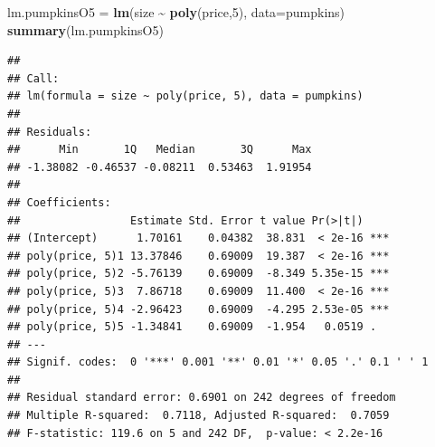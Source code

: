 \documentclass[
]{book}
\newenvironment{Shaded}{\begin{snugshade}}{\end{snugshade}}
\newcommand{\AttributeTok}[1]{\textcolor[rgb]{0.13,0.29,0.53}{#1}}
\newcommand{\DecValTok}[1]{\textcolor[rgb]{0.00,0.00,0.81}{#1}}
\newcommand{\FunctionTok}[1]{\textcolor[rgb]{0.13,0.29,0.53}{\textbf{#1}}}
\newcommand{\NormalTok}[1]{#1}
\newcommand{\OtherTok}[1]{\textcolor[rgb]{0.56,0.35,0.01}{#1}}
\newcommand{\SpecialCharTok}[1]{\textcolor[rgb]{0.81,0.36,0.00}{\textbf{#1}}}
\begin{document}
\begin{Shaded}
\begin{Highlighting}[]
\NormalTok{lm.pumpkinsO5 }\OtherTok{=}  \FunctionTok{lm}\NormalTok{(size }\SpecialCharTok{\textasciitilde{}} \FunctionTok{poly}\NormalTok{(price,}\DecValTok{5}\NormalTok{), }\AttributeTok{data=}\NormalTok{pumpkins)}
\FunctionTok{summary}\NormalTok{(lm.pumpkinsO5)}
\end{Highlighting}
\end{Shaded}

\begin{verbatim}
## 
## Call:
## lm(formula = size ~ poly(price, 5), data = pumpkins)
## 
## Residuals:
##      Min       1Q   Median       3Q      Max 
## -1.38082 -0.46537 -0.08211  0.53463  1.91954 
## 
## Coefficients:
##                 Estimate Std. Error t value Pr(>|t|)    
## (Intercept)      1.70161    0.04382  38.831  < 2e-16 ***
## poly(price, 5)1 13.37846    0.69009  19.387  < 2e-16 ***
## poly(price, 5)2 -5.76139    0.69009  -8.349 5.35e-15 ***
## poly(price, 5)3  7.86718    0.69009  11.400  < 2e-16 ***
## poly(price, 5)4 -2.96423    0.69009  -4.295 2.53e-05 ***
## poly(price, 5)5 -1.34841    0.69009  -1.954   0.0519 .  
## ---
## Signif. codes:  0 '***' 0.001 '**' 0.01 '*' 0.05 '.' 0.1 ' ' 1
## 
## Residual standard error: 0.6901 on 242 degrees of freedom
## Multiple R-squared:  0.7118, Adjusted R-squared:  0.7059 
## F-statistic: 119.6 on 5 and 242 DF,  p-value: < 2.2e-16
\end{verbatim}
\end{document}
